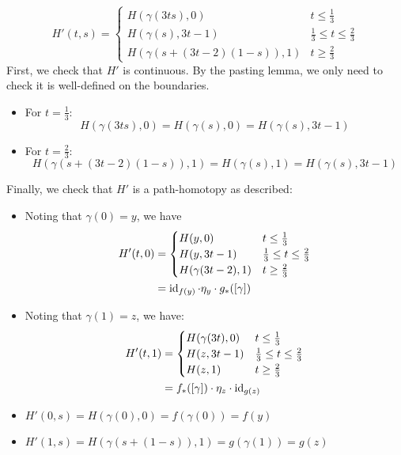 \documentclass[12pt]{article}
\begin{document}
\begin{solution}
\begin{enumerate}
    \[ H'(t, s) = \begin{cases}
        H(\gamma(3ts), 0) & t \leq \frac{1}{3}\\ 
        H(\gamma(s),3t-1) & \frac13 \leq t \leq \frac{2}{3} \\
        H(\gamma(s+(3t-2)(1-s)), 1) & t \geq \frac{2}{3}
    \end{cases}\]
    First, we check that $H'$ is continuous. By the pasting lemma, we only need to check it is well-defined on the boundaries. 
    \begin{itemize}
        \item For $t = \frac13$: 
        \[ H(\gamma(3ts), 0) = H(\gamma(s), 0) = H(\gamma(s), 3t-1)\]
        \item For $t = \frac23$:
        \[ H(\gamma(s+(3t-2)(1-s)), 1) = H(\gamma(s), 1) = H(\gamma(s), 3t-1)\]
    \end{itemize}
    Finally, we check that $H'$ is a path-homotopy as described:
    \begin{itemize}
        \item Noting that $\gamma(0) = y$, we have
        \begin{align*}
            H'(t, 0) &= \begin{cases}
                H(y, 0) & t \leq \frac{1}{3}\\ 
                H(y,3t-1) & \frac13 \leq t \leq \frac{2}{3} \\
                H(\gamma(3t-2), 1) & t \geq \frac{2}{3}
            \end{cases} \\
            &= \operatorname{id}_{f(y)} \cdot \eta_y \cdot g_*([\gamma]) 
        \end{align*}
        \item Noting that $\gamma(1) = z$, we have: 
            \begin{align*}
                H'(t, 1) &= \begin{cases}
                H(\gamma(3t), 0) & t \leq \frac{1}{3}\\ 
                H(z,3t-1) & \frac13 \leq t \leq \frac{2}{3} \\
                H(z, 1) & t \geq \frac{2}{3}
            \end{cases} \\
            &= f_*([\gamma]) \cdot \eta_z \cdot \operatorname{id}_{g(z)}
        \end{align*}
        \item $H'(0, s) = H(\gamma(0), 0) = f(\gamma(0)) = f(y)$
        \item $H'(1, s) = H(\gamma(s+(1-s)), 1) = g(\gamma(1)) = g(z)$

\end{itemize}
\end{enumerate}
\end{solution}
\end{document}
